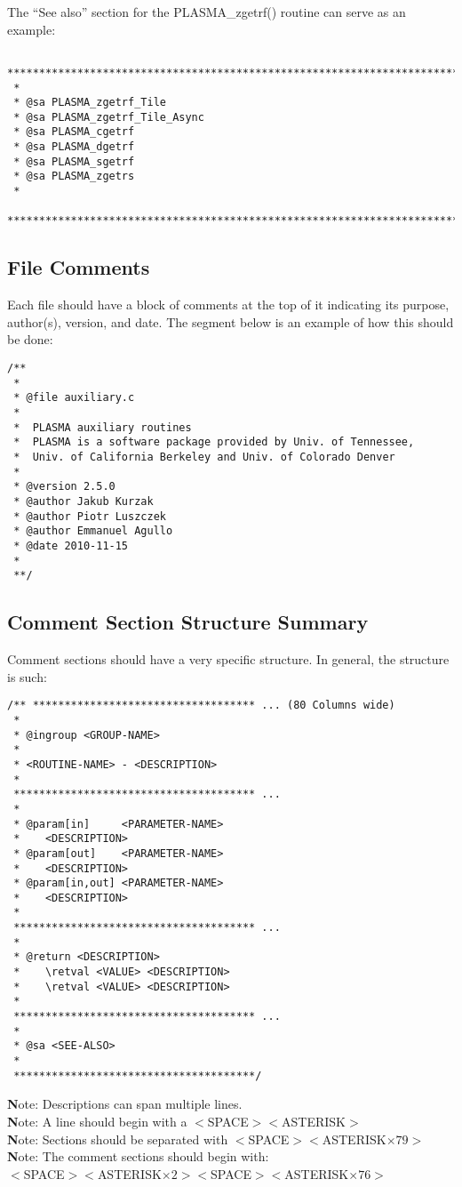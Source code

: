 The ``See also'' section for the PLASMA\_zgetrf() routine can serve as an example:
\begin{verbatim}
 *******************************************************************************
 *
 * @sa PLASMA_zgetrf_Tile
 * @sa PLASMA_zgetrf_Tile_Async
 * @sa PLASMA_cgetrf
 * @sa PLASMA_dgetrf
 * @sa PLASMA_sgetrf
 * @sa PLASMA_zgetrs
 *
 ******************************************************************************/
\end{verbatim}

\subsection{File Comments}
Each file should have a block of comments at the top of it indicating its purpose, author(s), version, and date.  The segment below is an example of how this should be done:
\begin{verbatim}
/**
 *
 * @file auxiliary.c
 *
 *  PLASMA auxiliary routines
 *  PLASMA is a software package provided by Univ. of Tennessee,
 *  Univ. of California Berkeley and Univ. of Colorado Denver
 *
 * @version 2.5.0
 * @author Jakub Kurzak
 * @author Piotr Luszczek
 * @author Emmanuel Agullo
 * @date 2010-11-15
 *
 **/
\end{verbatim}

\pagebreak
\subsection{Comment Section Structure Summary}
\label{comments:summary}
Comment sections should have a very specific structure. In general, the structure is such:
\begin{verbatim}
/** *********************************** ... (80 Columns wide)
 *
 * @ingroup <GROUP-NAME>
 *
 * <ROUTINE-NAME> - <DESCRIPTION>
 *
 ************************************** ...
 *
 * @param[in]     <PARAMETER-NAME>
 *    <DESCRIPTION>
 * @param[out]    <PARAMETER-NAME>
 *    <DESCRIPTION>
 * @param[in,out] <PARAMETER-NAME>
 *    <DESCRIPTION>
 *
 ************************************** ...
 *
 * @return <DESCRIPTION>
 *    \retval <VALUE> <DESCRIPTION>
 *    \retval <VALUE> <DESCRIPTION>     
 *
 ************************************** ...
 *
 * @sa <SEE-ALSO>
 *
 **************************************/
\end{verbatim}

{\textbf Note:} Descriptions can span multiple lines. \\
{\textbf Note:} A line should begin with a $<$SPACE$><$ASTERISK$>$ \\
{\textbf Note:} Sections should be separated with $<$SPACE$><$ASTERISK$\times 79>$ \\
{\textbf Note:} The comment sections should begin with: \\
$<$SPACE$><$ASTERISK$\times 2><$SPACE$><$ASTERISK$\times 76>$

